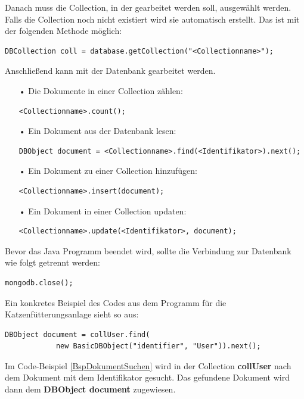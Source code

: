 Danach muss die Collection, in der gearbeitet werden soll, ausgewählt werden. Falls die Collection noch nicht existiert wird sie automatisch erstellt. Das ist mit der folgenden Methode möglich:
\begin{lstlisting}[style=JavaStyle, caption=Collection auswählen]
	DBCollection coll = database.getCollection("<Collectionname>");
\end{lstlisting}
Anschließend kann mit der Datenbank gearbeitet werden. 
\begin{itemize}
\item[•] Die Dokumente in einer Collection zählen:
\begin{lstlisting}[style=JavaStyle, caption=Anzahl der Collections zählen]
	<Collectionname>.count();
\end{lstlisting}
\item[•] Ein Dokument aus der Datenbank lesen:
\begin{lstlisting}[style=JavaStyle, caption=Nach Dokument suchen]
	DBObject document = <Collectionname>.find(<Identifikator>).next();
\end{lstlisting}
\item[•] Ein Dokument zu einer Collection hinzufügen:
\begin{lstlisting}[style=JavaStyle, caption=Ein Dokument hinzufügen]
	<Collectionname>.insert(document);
\end{lstlisting}	
\item[•] Ein Dokument in einer Collection updaten:
\begin{lstlisting}[style=JavaStyle, caption=Ein Dokument updaten]
	<Collectionname>.update(<Identifikator>, document);
\end{lstlisting}
\end{itemize}

Bevor das Java Programm beendet wird, sollte die Verbindung zur Datenbank wie folgt getrennt werden: 
\begin{lstlisting}[style=JavaStyle, caption=Verbindung zur Datenbank trennen]
	mongodb.close();
\end{lstlisting}

Ein konkretes Beispiel des Codes aus dem Programm für die Katzenfütterungsanlage sieht so aus:
\begin{lstlisting}[style=JavaStyle, caption=Konkretes Beispiel: Dokument suchen, label=BspDokumentSuchen]
	DBObject document = collUser.find(
			new BasicDBObject("identifier", "User")).next();
\end{lstlisting}
Im Code-Beispiel \ref{BspDokumentSuchen} wird in der Collection \textbf{collUser} nach dem Dokument mit dem Identifikator \textbf{} gesucht. Das gefundene Dokument wird dann dem \textbf{DBObject document} zugewiesen. 


